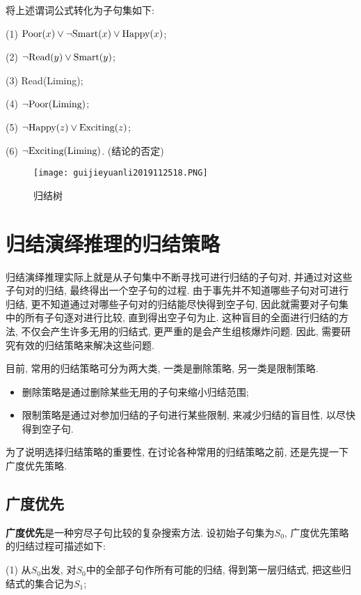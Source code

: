 将上述谓词公式转化为子句集如下:

    (1) $\textup{Poor}(x)\vee \neg \textup{Smart}(x)\vee \textup{Happy}(x)$;

    (2) $\neg \textup{Read}(y)\vee \textup{Smart}(y)$;

    (3) \textup{Read}(Liming);

    (4) $\neg \textup{Poor}(\textup{Liming})$;

    (5) $\neg \textup{Happy}(z)\vee \textup{Exciting}(z)$;

    (6) $\neg \textup{Exciting}(\textup{Liming})$. (结论的否定)

\begin{figure}[H]
    \centering
    \texttt{[image: guijieyuanli2019112518.PNG]}
    \caption{归结树}
    \label{AI32fig18}
\end{figure}
\section{归结演绎推理的归结策略}
归结演绎推理实际上就是从子句集中不断寻找可进行归结的子句对, 并通过对这些子句对的归结, 最终得出一个空子句的过程. 由于事先并不知道哪些子句对可进行归结, 更不知道通过对哪些子句对的归结能尽快得到空子句, 因此就需要对子句集中的所有子句逐对进行比较, 直到得出空子句为止. 这种盲目的全面进行归结的方法, 不仅会产生许多无用的归结式, 更严重的是会产生组核爆炸问题. 因此, 需要研究有效的归结策略来解决这些问题.

目前, 常用的归结策略可分为两大类, 一类是删除策略, 另一类是限制策略.
\begin{itemize}
    \item 删除策略是通过删除某些无用的子句来缩小归结范围;
    \item 限制策略是通过对参加归结的子句进行某些限制, 来减少归结的盲目性, 以尽快得到空子句.
\end{itemize}

为了说明选择归结策略的重要性, 在讨论各种常用的归结策略之前, 还是先提一下广度优先策略.
\subsection{广度优先}
\textbf{广度优先}是一种穷尽子句比较的复杂搜索方法. 设初始子句集为$S_0$, 广度优先策略的归结过程可描述如下:

(1) 从$S_0$出发, 对$S_0$中的全部子句作所有可能的归结, 得到第一层归结式, 把这些归结式的集合记为$S_1$;

